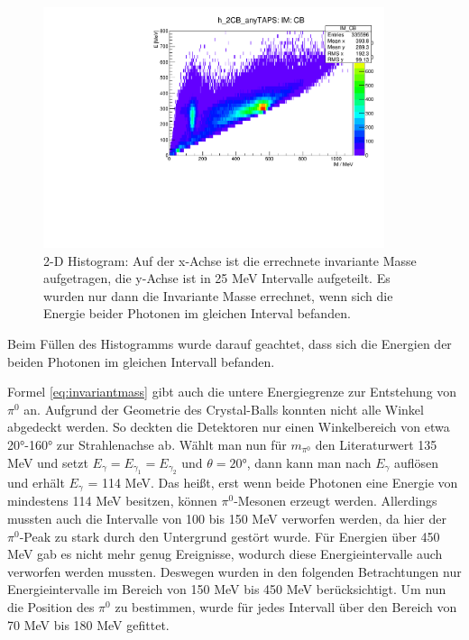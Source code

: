 \documentclass[a4paper,11pt,oneside,final,german,openbib,pdftex]{scrbook}
\begin{document}
{\begin{figure}[h]
	\begin{center}
		\includegraphics[width=100mm]{energydependencyallbins0903}
	
		\caption{2-D Histogram: Auf der x-Achse ist die errechnete invariante Masse aufgetragen, die y-Achse ist in 25 MeV Intervalle aufgeteilt. Es wurden nur dann die Invariante Masse errechnet, wenn sich die Energie beider Photonen im gleichen Interval befanden.}
			\label{fig:Energy-Interval-Hist-All-Bins}
	\end{center}
\end{figure}

Beim Füllen des Histogramms wurde darauf geachtet, dass sich die Energien der beiden Photonen im gleichen Intervall befanden.

Formel \ref{eq:invariantmass} gibt auch die untere Energiegrenze zur Entstehung von $\pi^0$ an. Aufgrund der Geometrie des Crystal-Balls konnten nicht alle Winkel abgedeckt werden. So deckten die Detektoren nur einen Winkelbereich von etwa 20°-160° zur Strahlenachse ab. Wählt man nun für $m_{\pi^0}$ den Literaturwert 135 MeV und setzt $E_{\gamma}=E_{\gamma_1}=E_{\gamma_2}$ und $\theta= 20$°, dann kann man nach $E_{\gamma}$ auflösen und erhält $E_{\gamma}$ = 114 MeV. Das heißt, erst wenn beide Photonen eine Energie von mindestens 114 MeV besitzen, können $\pi^0$-Mesonen erzeugt werden. Allerdings mussten auch die Intervalle von 100 bis 150 MeV verworfen werden, da hier der $\pi^0$-Peak zu stark durch den Untergrund gest\"ort wurde. Für Energien über 450 MeV gab es nicht mehr genug Ereignisse, wodurch diese Energieintervalle auch verworfen werden mussten. Deswegen wurden in den folgenden Betrachtungen nur Energieintervalle im Bereich von 150 MeV bis 450 MeV berücksichtigt.
Um nun die Position des $\pi^0$ zu bestimmen, wurde für jedes Intervall über den Bereich von 70 MeV bis 180 MeV gefittet. 


}
\end{document}

